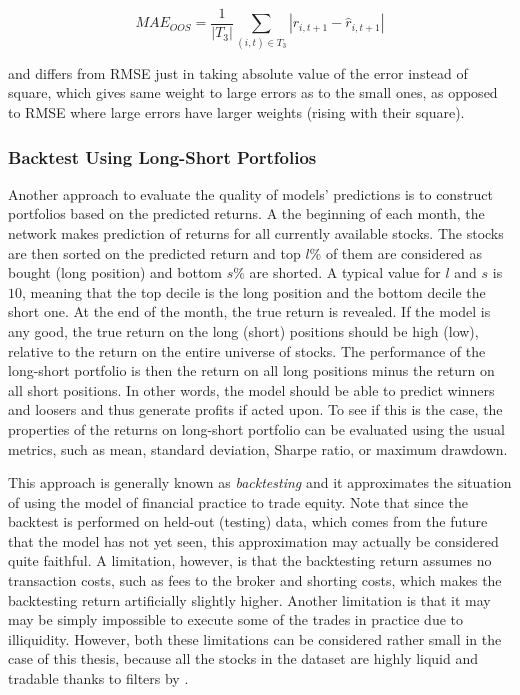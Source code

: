 			\begin{equation*}
				MAE_{OOS} = \frac{1}{|T_3|} \sum_{(i,t)\in T_3} |r_{i,t+1}-	\hat{r}_{i, t+1}|
			\end{equation*}
			
			and differs from RMSE just in taking absolute value of the error instead of square, which gives same weight to large errors as to the small ones, as opposed to RMSE where large errors have larger weights (rising with their square). 
	
		\subsubsection{Backtest Using Long-Short Portfolios}
			Another approach to evaluate the quality of models' predictions is to construct portfolios based on the predicted returns. A the beginning of each month, the network makes prediction of returns for all currently available stocks. The stocks are then sorted on the predicted return and top $l\%$ of them are considered as bought (long position) and bottom $s\%$ are shorted. A typical value for $l$ and $s$ is $10$, meaning that the top decile is the long position and the bottom decile the short one. At the end of the month, the true return is revealed. If the model is any good, the true return on the long (short) positions should be high (low), relative to the return on the entire universe of stocks. The performance of the long-short portfolio is then the return on all long positions minus the return on all short positions. In other words, the model should be able to predict winners and loosers and thus generate profits if acted upon. To see if this is the case, the properties of the returns on long-short portfolio can be evaluated using the usual metrics, such as mean, standard deviation, Sharpe ratio, or maximum drawdown. 
			
			This approach is generally known as \textit{backtesting} and it approximates the situation of using the model of financial practice to trade equity. Note that since the backtest is performed on held-out (testing) data, which comes from the future that the model has not yet seen, this approximation may actually be considered quite faithful. A limitation, however, is that the backtesting return assumes no transaction costs, such as fees to the broker and shorting costs, which makes the backtesting return artificially slightly higher. Another limitation is that it may may be simply impossible to execute some of the trades in practice  due to illiquidity. However, both these limitations can be considered rather small in the case of this thesis, because all the stocks in the dataset are highly liquid and tradable thanks to filters by \cite{tobek2020does}. 
			
